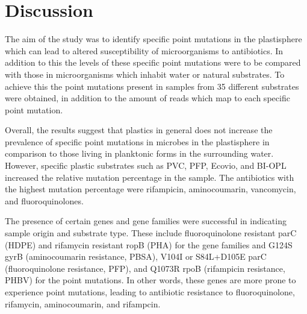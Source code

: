 \chapter{Discussion}



The aim of the study was to identify specific point mutations in the plastisphere which can lead to altered susceptibility of microorganisms to antibiotics. 
In addition to this the levels of these specific point mutations were to be compared with those in microorganisms which inhabit water or natural substrates.
To achieve this the point mutations present in samples from 35 different substrates were obtained, in addition to the amount of reads which map to each specific point mutation. 

Overall, the results suggest that plastics in general does not increase the prevalence of specific point mutations in microbes in the plastisphere in comparison to those living in planktonic forms in the surrounding water.
However, specific plastic substrates such as PVC, PFP, Ecovio, and BI-OPL increased the relative mutation percentage in the sample.
The antibiotics with the highest mutation percentage were rifampicin, aminocoumarin, vancomycin, and fluoroquinolones.

The presence of certain genes and gene families were successful in indicating sample origin and substrate type.
These include fluoroquinolone resistant parC (HDPE) and rifamycin resistant ropB (PHA) for the gene families and G124S gyrB (aminocoumarin resistance, PBSA), V104I or S84L+D105E parC (fluoroquinolone resistance, PFP), and Q1073R rpoB (rifampicin resistance, PHBV) for the point mutations.
In other words, these genes are more prone to experience point mutations, leading to antibiotic resistance to fluoroquinolone, rifamycin, aminocoumarin, and rifampcin.

